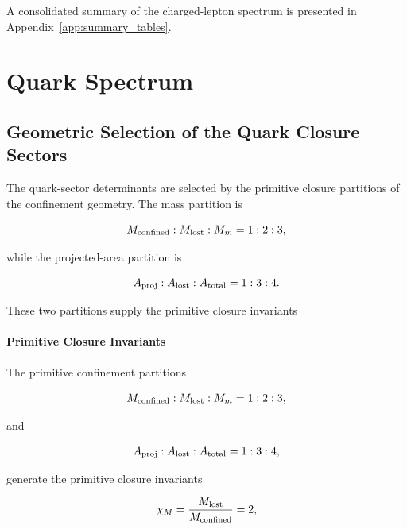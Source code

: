 \documentclass[11pt]{article}
\theoremstyle{definition}
\theoremstyle{remark}
\begin{document}
A consolidated summary of the charged-lepton spectrum is
presented in Appendix~\ref{app:summary_tables}.


\section{Quark Spectrum}
\label{sec:quark_spectrum}

\subsection{Geometric Selection of the Quark Closure Sectors}
\label{subsec:geometric_selection_quark_closure_sectors}

The quark-sector determinants are selected by the primitive
closure partitions of the confinement geometry. The mass
partition is

\begin{equation}
M_{\rm confined}:M_{\rm lost}:M_m
=
1:2:3,
\label{eq:quark_mass_partition_repeat}
\end{equation}

while the projected-area partition is

\begin{equation}
A_{\rm proj}:A_{\rm lost}:A_{\rm total}
=
1:3:4.
\label{eq:quark_area_partition_repeat}
\end{equation}

These two partitions supply the primitive closure invariants

\paragraph{Primitive Closure Invariants}

The primitive confinement partitions

\begin{equation}
M_{\rm confined}:M_{\rm lost}:M_m
=
1:2:3,
\label{eq:primitive_mass_partition}
\end{equation}

and

\begin{equation}
A_{\rm proj}:A_{\rm lost}:A_{\rm total}
=
1:3:4,
\label{eq:primitive_area_partition}
\end{equation}

generate the primitive closure invariants

\begin{equation}
\chi_M
=
\frac{M_{\rm lost}}
     {M_{\rm confined}}
=
2,
\end{equation}
\end{document}
